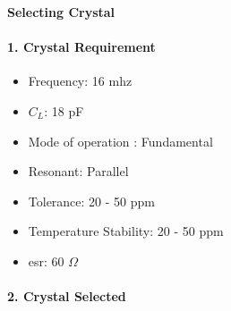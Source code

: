 	\textbf{Selecting Crystal}
	
	\paragraph{1. Crystal Requirement}
	
		\begin{itemize}
			\item Frequency: 16 \gls{mhz}
			\item $C_{L}$: 18 pF
			\item Mode of operation : Fundamental 
			\item Resonant: Parallel
			\item Tolerance: 20 - 50 \acrshort{ppm}
			\item Temperature Stability: 20 - 50 \acrshort{ppm}
			\item \gls{esr}: 60 $\Omega$
		\end{itemize}
	
	\paragraph{2. Crystal Selected}
	
